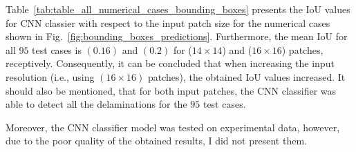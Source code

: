 Table~\ref{tab:table_all_numerical_cases_bounding_boxes} presents the IoU values for CNN classier with respect to the input patch size for the numerical cases shown in Fig.~\ref{fig:bounding_boxes_predictions}.
Furthermore, the mean IoU for all \(95\) test cases is \((0.16)\) and \((0.2)\) for (\(14\times14\)) and (\(16\times16\)) patches, receptively.
Consequently, it can be concluded that when increasing the input resolution (i.e., using \((16\times16)\) patches), the obtained IoU values increased.
It should also be mentioned, that for both input patches, the CNN classifier was able to detect all the delaminations for the \(95\) test cases.

Moreover, the CNN classifier model was tested on experimental data, however, due to the poor quality of the obtained results, I did not present them.

